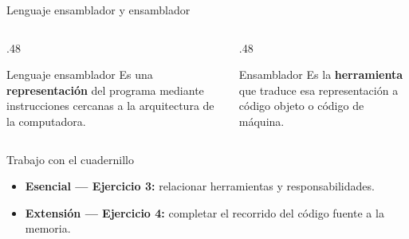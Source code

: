 \documentclass[11pt,spanish]{beamer}
\newcommand{\term}[1]{\textbf{\textcolor{indiagreen!80!black}{#1}}}
\newcommand{\actividad}[1]{\textbf{\textcolor{Rojo}{#1}}}
\begin{document}
\begin{frame}{Lenguaje ensamblador y ensamblador}
\vfill

\begin{columns}[T,onlytextwidth]
\begin{column}{.48\textwidth}
\begin{block}{Lenguaje ensamblador}
\small
Es una \term{representación} del programa mediante instrucciones cercanas a la arquitectura de la computadora.
\end{block}
\end{column}
\begin{column}{.48\textwidth}
\begin{block}{Ensamblador}
\small
Es la \term{herramienta} que traduce esa representación a código objeto o código de máquina.
\end{block}
\end{column}
\end{columns}

\bigskip

\begin{center}
\end{center}

\vfill
\end{frame}

\begin{frame}{Trabajo con el cuadernillo}
\vfill

\begin{center}
\end{center}

\bigskip

\begin{itemize}
\item \textbf{Esencial --- Ejercicio 3:} relacionar herramientas y responsabilidades.
\item \textbf{Extensión --- Ejercicio 4:} completar el recorrido del código fuente a la memoria.
\end{itemize}

\vfill
\end{frame}
\end{document}
